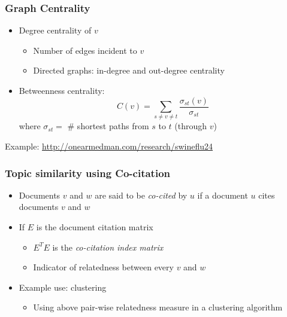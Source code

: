 \documentclass{beamer}
\begin{document}

\begin{frame}
  \frametitle{Graph Centrality}

  \begin{itemize}
  \item Degree centrality of $v$
      \begin{itemize}
      \item Number of edges incident to $v$
      \item Directed graphs: in-degree and out-degree centrality
      \end{itemize}
  \item Betweenness centrality:
      \begin{displaymath}
          C(v) = \sum_{s \neq v \neq t}\frac{\sigma_{st}(v)}{\sigma_{st}}
      \end{displaymath}
      where $\sigma_{st} =$ \# shortest paths from $s$ to $t$ (through $v$)
  \end{itemize}

  \vfill

  Example: \url{http://onearmedman.com/research/swineflu24}

\end{frame}

\begin{frame}
  \frametitle{Topic similarity using Co-citation}

  \begin{itemize}
  \item Documents $v$ and $w$ are said to be \emph{co-cited} by $u$ if a
      document $u$ cites documents $v$ and $w$
  \item If $E$ is the document citation matrix
    \begin{itemize}
    \item $E^TE$ is the \emph{co-citation index matrix}
    \item Indicator of relatedness between every $v$ and $w$
    \end{itemize}
  \item Example use: clustering
    \begin{itemize}
    \item Using above pair-wise relatedness measure in a clustering algorithm
    \end{itemize}
  \end{itemize}

\end{frame}
\end{document}
